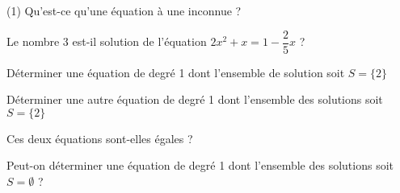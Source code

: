 \documentclass[a4paper,12pt]{article}
\begin{document}
\begin{activite}
	\tcblower
\end{activite}


\begin{activite}
	\tcblower
\end{activite}

\begin{activite}
	\tcblower
\begin{tasks}(1)
\task Qu'est-ce qu'une équation à une inconnue ?

\task Le nombre 3 est-il solution de l'équation $2x^2 + x = 1 - \dfrac{2}{5}x$ ?

\task Déterminer une équation de degré 1 dont l'ensemble de solution soit $S = \{2\}$

\task Déterminer une autre équation de degré 1 dont l'ensemble des solutions soit $S = \{2\}$

\task Ces deux équations sont-elles égales ?

\task Peut-on déterminer une équation de degré 1 dont l'ensemble des solutions soit $S = \emptyset$ ?
\end{tasks}
\end{activite}
\end{document}
